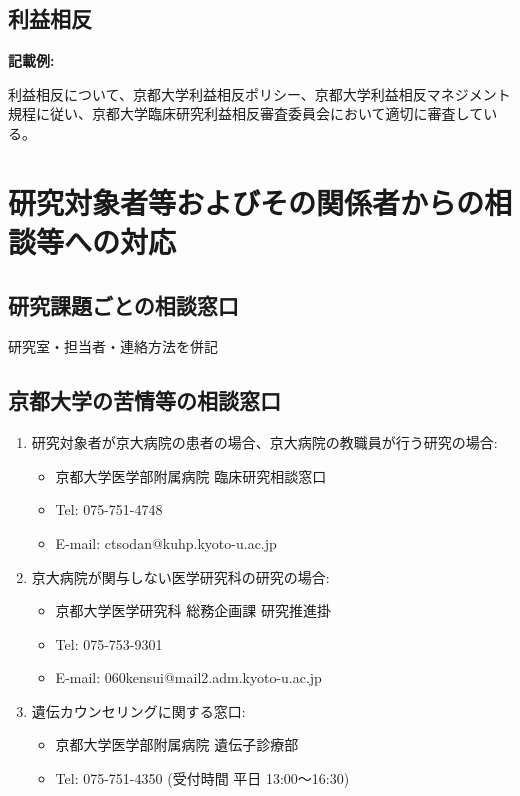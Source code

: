 \documentclass{kyodai-protocol}
\begin{document}
\subsection{利益相反}

\textbf{記載例:}

利益相反について、京都大学利益相反ポリシー、京都大学利益相反マネジメント規程に従い、京都大学臨床研究利益相反審査委員会において適切に審査している。

\section{研究対象者等およびその関係者からの相談等への対応}
\label{sec:consultation}

\subsection{研究課題ごとの相談窓口}

研究室・担当者・連絡方法を併記

\subsection{京都大学の苦情等の相談窓口}

\begin{enumerate}
\item 研究対象者が京大病院の患者の場合、京大病院の教職員が行う研究の場合:
  \begin{itemize}
  \item 京都大学医学部附属病院 臨床研究相談窓口
  \item Tel: 075-751-4748
  \item E-mail: ctsodan@kuhp.kyoto-u.ac.jp
  \end{itemize}

\item 京大病院が関与しない医学研究科の研究の場合:
  \begin{itemize}
  \item 京都大学医学研究科 総務企画課 研究推進掛
  \item Tel: 075-753-9301
  \item E-mail: 060kensui@mail2.adm.kyoto-u.ac.jp
  \end{itemize}

\item 遺伝カウンセリングに関する窓口:
  \begin{itemize}
  \item 京都大学医学部附属病院 遺伝子診療部
  \item Tel: 075-751-4350 (受付時間 平日 13:00〜16:30)
  \end{itemize}
\end{enumerate}
\end{document}
